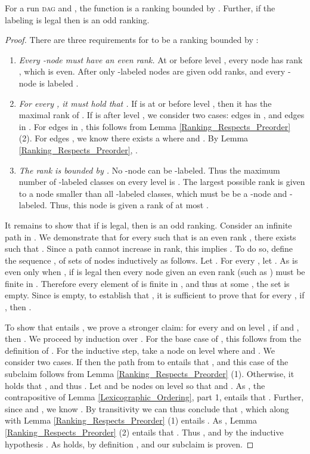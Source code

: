 \documentclass{LMCS}
\newcommand{\DAG}{\textsc{dag}\xspace}
\begin{document}
\begin{lem}\label{Slices_Provide_Ranking}
For a run \DAG  and , the function  is a ranking bounded by .
Further, if the labeling  is legal then  is an odd ranking.
\end{lem}
\begin{proof}
There are three requirements for  to be a ranking bounded by :
\begin{enumerate}[(1)]
\item \textit{Every -node must have an even rank.} At or before 
level ,
every node has rank ,
which is even.  After  only -labeled nodes are given odd ranks, and every -node is
labeled .

\item \textit{For every , it must hold that .} 
If  is at or before level , then it has the maximal rank of . If  is after level , we
consider two cases: edges in , and edges in .  For edges in , this follows
from Lemma \ref{Ranking_Respects_Preorder} (2). For edges , we know there
exists a  where  and . By Lemma
\ref{Ranking_Respects_Preorder}, .

\item \textit{The rank is bounded by .} No -node can be -labeled. Thus the maximum
number of -labeled classes on every level is .  The largest possible
rank is given to a node smaller than all -labeled classes, which must be
be a -node and -labeled.  Thus, this node is given a rank of at most .\smallskip
\end{enumerate}

\noindent It remains to show that if  is legal, then  is an odd ranking.  Consider an
infinite path  in .  We demonstrate that for every  
such that  is an even rank , there exists  such that . 
Since
a path cannot increase in rank, this implies . To do so, define the
sequence , of sets of nodes inductively as follows.  Let .  For every , let .  As  is even only when , if  is
legal then every node given an even rank (such as ) must be finite in . Therefore every
element of  is finite in , and thus at some , the set  is empty. Since
 is empty, to establish that , it is sufficient to prove  that for
every , if , then .

To show that  entails , we prove a stronger claim: for every  and  on level , if  and , then .  We
proceed by induction over .  For the base case of , this follows from the definition
of . For the inductive step, take a 
node
 on level  where  and .  We consider two cases. If  then the path 
from  to  entails that , and this case of the subclaim
follows from Lemma \ref{Ranking_Respects_Preorder} (1).  Otherwise, it holds that , and thus . Let  and  be nodes on level  so that
 and .  As , the contrapositive of Lemma
\ref{Lexicographic_Ordering}, part 1, entails that . Further, since  and , we know .  By transitivity we can thus
conclude that , which along with Lemma \ref{Ranking_Respects_Preorder} (1) entails
. As , Lemma \ref{Ranking_Respects_Preorder} (2)
entails that . Thus , and by the inductive
hypothesis . As  holds, by definition , and our subclaim is proven.
\end{proof}
\end{document}
